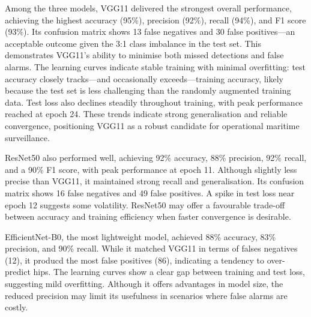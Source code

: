 \documentclass[11pt]{article}
\begin{document}
	Among the three models, VGG11 delivered the strongest overall performance, achieving the highest accuracy (95\%), precision (92\%), recall (94\%), and F1 score (93\%). Its confusion matrix shows 13 false negatives and 30 false positives—an acceptable outcome given the 3:1 class imbalance in the test set. This demonstrates VGG11's ability to minimise both missed detections and false alarms. The learning curves indicate stable training with minimal overfitting: test accuracy closely tracks—and occasionally exceeds—training accuracy, likely because the test set is less challenging than the randomly augmented training data. Test loss also declines steadily throughout training, with peak performance reached at epoch 24. These trends indicate strong generalisation and reliable convergence, positioning VGG11 as a robust candidate for operational maritime surveillance.
	
	ResNet50 also performed well, achieving 92\% accuracy, 88\% precision, 92\% recall, and a 90\% F1 score, with peak performance at epoch 11.  Although slightly less precise than VGG11, it maintained strong recall and generalisation. Its confusion matrix shows 16 false negatives and 49 false positives. A spike in test loss near epoch 12 suggests some volatility. ResNet50 may offer a favourable trade-off between accuracy and training efficiency when faster convergence is desirable.
	
	EfficientNet-B0, the most lightweight model, achieved 88\% accuracy, 83\% precision, and 90\% recall. While it matched VGG11 in terms of falses negatives (12), it producd the most false positives (86), indicating a tendency to over-predict hips. The learning curves show a clear gap between training and test loss, suggesting mild overfitting. Although it offers advantages in model size, the reduced precision may limit its usefulness in scenarios where false alarms are costly.
	
\end{document}
